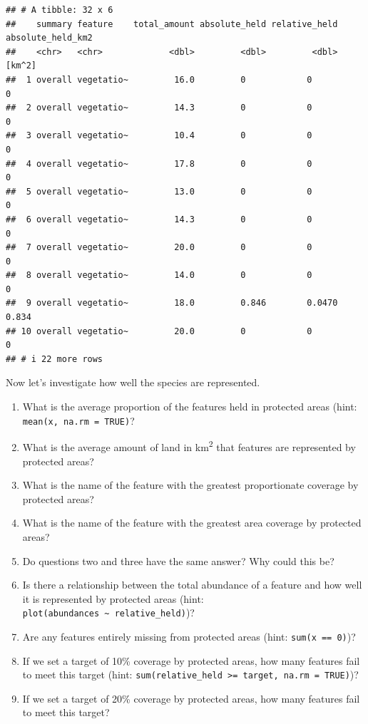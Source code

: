 \documentclass[
  12pt,
]{book}
\makeatletter
\providecommand{\tightlist}{%
  \setlength{\itemsep}{0pt}\setlength{\parskip}{0pt}}
\newenvironment{kframe}{%
\medskip{}
\setlength{\fboxsep}{.8em}
 \def\at@end@of@kframe{}%
 \ifinner\ifhmode%
  \def\at@end@of@kframe{\end{minipage}}%
  \begin{minipage}{\columnwidth}%
 \fi\fi%
 \def\FrameCommand##1{\hskip\@totalleftmargin \hskip-\fboxsep
 \colorbox{shadecolor}{##1}\hskip-\fboxsep
     \hskip-\linewidth \hskip-\@totalleftmargin \hskip\columnwidth}%
 \MakeFramed {\advance\hsize-\width
   \@totalleftmargin\z@ \linewidth\hsize
   \@setminipage}}%
 {\par\unskip\endMakeFramed%
 \at@end@of@kframe}
\newenvironment{rmdblock}[1]
  {
  \begin{itemize}
  \renewcommand{\labelitemi}{
    \raisebox{-.7\height}[0pt][0pt]{
      {\setkeys{Gin}{width=3em,keepaspectratio}\texttt{[image: images/\#1]}}
    }
  }
  \setlength{\fboxsep}{1em}
  \begin{kframe}
  \item
  }
  {
  \end{kframe}
  \end{itemize}
  }
\newenvironment{rmdquestion}
  {\begin{rmdblock}{question}}
  {\end{rmdblock}}
\makeatother
\begin{document}
\begin{verbatim}
## # A tibble: 32 x 6
##    summary feature    total_amount absolute_held relative_held absolute_held_km2
##    <chr>   <chr>             <dbl>         <dbl>         <dbl>            [km^2]
##  1 overall vegetatio~         16.0         0            0                  0    
##  2 overall vegetatio~         14.3         0            0                  0    
##  3 overall vegetatio~         10.4         0            0                  0    
##  4 overall vegetatio~         17.8         0            0                  0    
##  5 overall vegetatio~         13.0         0            0                  0    
##  6 overall vegetatio~         14.3         0            0                  0    
##  7 overall vegetatio~         20.0         0            0                  0    
##  8 overall vegetatio~         14.0         0            0                  0    
##  9 overall vegetatio~         18.0         0.846        0.0470             0.834
## 10 overall vegetatio~         20.0         0            0                  0    
## # i 22 more rows
\end{verbatim}

Now let's investigate how well the species are represented.

\begin{rmdquestion}
\begin{enumerate}
\def\labelenumi{\arabic{enumi}.}
\tightlist
\item
  What is the average proportion of the features held in protected areas (hint: \texttt{mean(x,\ na.rm\ =\ TRUE)}?
\item
  What is the average amount of land in km\textsuperscript{2} that features are represented by protected areas?
\item
  What is the name of the feature with the greatest proportionate coverage by protected areas?
\item
  What is the name of the feature with the greatest area coverage by protected areas?
\item
  Do questions two and three have the same answer? Why could this be?
\item
  Is there a relationship between the total abundance of a feature and how well it is represented by protected areas (hint: \texttt{plot(abundances\ \textasciitilde{}\ relative\_held)})?
\item
  Are any features entirely missing from protected areas (hint: \texttt{sum(x\ ==\ 0)})?
\item
  If we set a target of 10\% coverage by protected areas, how many features fail to meet this target (hint: \texttt{sum(relative\_held\ \textgreater{}=\ target,\ na.rm\ =\ TRUE)})?
\item
  If we set a target of 20\% coverage by protected areas, how many features fail to meet this target?
\end{enumerate}
\end{rmdquestion}
\end{document}
